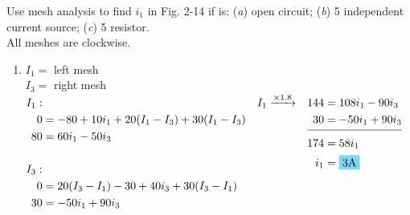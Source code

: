 Use mesh analysis to find $i_1$ in Fig. 2-14 if  is: (\emph{a}) open circuit; (\emph{b}) 5\qw{\A} independent current source; (\emph{c}) 5\qw{\ohm} resistor.\\[2mm]All meshes are clockwise.
\begin{enumerate}[leftmargin=2cm,labelsep=.5cm,label=\bfseries\alph*)]
	\item $I_1 = $ left mesh\\
	$I_3 = $ right mesh\\[5mm]
	$
	\begin{aligned}[t]
	I_1:\\
	0 &= -80+10i_1+20(I_1-I_3)+30(I_1-I_3) \\
	80 &= 60i_1-50i_3 \\[5mm]
	I_3:\\
	0 &= 20(I_3-I_1)-30+40i_3+30(I_3-I_1)\\
	30 &= -50i_1+90i_3 
	\end{aligned}
	\\[5mm]
	\begin{aligned}[t]
	I_1 & \xrightarrow{\times 1.8} & 144 &= 108i_1-90i_3 \\
	& & 30 &= -50i_1+90i_3 \\[-3mm]
	\cline{3-4}
	& & 174 &= 58i_1\\
	& & i_1 &= \hlbox{3\qw{\A}}
	\end{aligned} $
	\\[1cm]	
\end{enumerate}